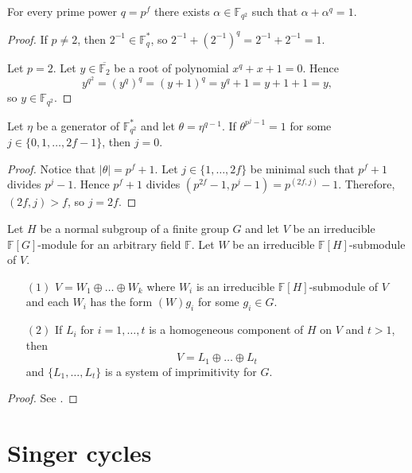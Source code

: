 \begin{Lem}\label{al}
For every prime power $q=p^f$ there  exists $\alpha \in \mathbb{F}_{q^2}$ such that $\alpha+ \alpha^q=1.$
\end{Lem}
\begin{proof}
If $p \ne 2$, then  $2^{-1} \in \mathbb{F}_q^{*}$, so $2^{-1} + (2^{-1})^q=2^{-1} + 2^{-1}=1.$

Let $p=2.$ Let $y \in \overline{\mathbb{F}_2}$ be a root of polynomial $x^q+x+1=0$. Hence 
$$y^{q^2}=(y^q)^q=(y+1)^q=y^q+1=y+1+1=y,$$
so $y \in \mathbb{F}_{q^2}.$
\end{proof} 

\begin{Lem}
\label{pj10}
Let $\eta$ be a generator of $\mathbb{F}_{q^2}^*$ and let $\theta=\eta^{q-1}.$ If $\theta^{p^j-1}=1$ for some $j \in \{0,1, \ldots, 2f-1\}$, then $j=0.$
\end{Lem}
\begin{proof}
Notice that $|\theta|=p^f+1.$ Let $j \in \{1, \ldots, 2f\}$ be minimal such that $p^f+1$ divides $p^j-1.$ Hence $p^f+1$ divides $(p^{2f}-1,p^j-1)=p^{(2f,j)}-1.$ Therefore, $(2f,j)>f$, so $j=2f.$
\end{proof}


\begin{Th}\label{cliff}
 Let $H$ be a normal subgroup of a finite group $G$ and let $V$ be an irreducible $\mathbb{F}[G]$-module for an arbitrary field $\mathbb{F}.$ Let $W$ be an irreducible $\mathbb{F}[H]$-submodule of $V$. 
\begin{itemize}
\item[$(1)$] $V=W_1 \oplus \ldots \oplus W_k$ where $W_i$ is an irreducible $\mathbb{F}[H]$-submodule of $V$ and each $W_i$ has the form $(W)g_i$ for some $g_i \in G.$
\item[$(2)$] If $L_i$ for $i=1, \ldots, t$ is a homogeneous component of $H$ on $V$  and $t>1$, then $$V=L_1 \oplus \ldots \oplus L_t$$ and $\{L_1, \ldots, L_t\}$ is a system of imprimitivity for $G$. 
\end{itemize} 
\end{Th}
\begin{proof}
See \cite[\S 16]{sup}.
\end{proof}





\section{Singer cycles}
\label{sinsec}


